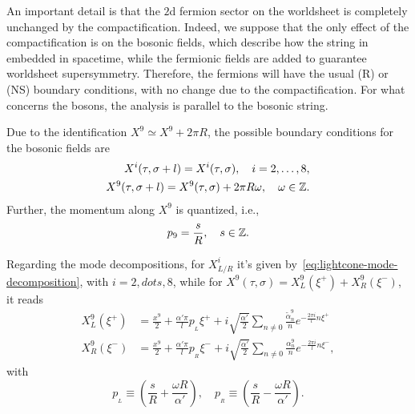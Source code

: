 An important detail is that the $2$d fermion sector on the worldsheet is completely unchanged by the compactification. Indeed, we suppose that the only effect of the compactification is on the bosonic fields, which describe how the string in embedded in spacetime, while the fermionic fields are added to guarantee worldsheet supersymmetry. Therefore, the fermions will have the usual (R) or (NS) boundary conditions, with no change due to the compactification. For what concerns the bosons, the analysis is parallel to the bosonic string.

Due to the identification $X^9 \simeq X^9 + 2\pi R$, the possible boundary conditions for the bosonic fields are
\begin{equation}
\begin{aligned}
    X^i (\tau, \sigma +l) = X^i(\tau,\sigma), \quad i = 2, \dots, 8, \\
    X^9(\tau,\sigma + l) = X^9(\tau,\sigma) + 2\pi R \omega, \quad \omega \in \mathbb{Z} .
\end{aligned}
\end{equation}
Further, the momentum along $X^9$ is quantized, i.e.,
\begin{equation}
    p_9 = \frac{s}{R}, \quad s \in \mathbb{Z}.
\end{equation}

Regarding the mode decompositions, for $X^i_{L/R}$ it's given by~\eqref{eq:lightcone-mode-decomposition}, with $i = 2, dots, 8$, while for $X^9 (\tau, \sigma) = X^9_L (\xi^+) + X^9_R (\xi^-)$, it reads
\begin{subequations}
\begin{align}
    X^{9}_L(\xi^+)     &= \frac{x^{9}}{2} + \frac{\alpha' \pi}{l} p_{\!_L} \xi^+ + i \sqrt{\frac{\alpha'}{2}} \sum_{n\neq 0} \frac{\tilde{\alpha}^{9}_n}{n}e^{-\frac{2\pi i}{l}n \xi^+} \\
    X^{9}_R(\xi^-)     &= \frac{x^{9}}{2} + \frac{\alpha' \pi}{l} p_{\!_R} \xi^- + i \sqrt{\frac{\alpha'}{2}} \sum_{n\neq 0} \frac{{\alpha}^{9}_n}{n}e^{-\frac{2\pi i}{l}n \xi^-},
\end{align}
\end{subequations}
with
\begin{equation}
    p_{\!_L} \equiv \left( \frac{s}{R} + \frac{\omega R}{\alpha'} \right), \quad p_{\!_R} \equiv \left( \frac{s}{R} - \frac{\omega R}{\alpha'} \right) .
\end{equation}

